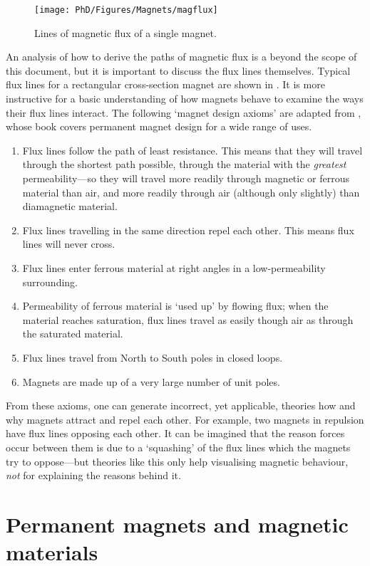 \documentclass[11pt,a4paper]{memoir}
\begin{document}
\begin{figure}
\texttt{[image: PhD/Figures/Magnets/magflux]}
\caption{Lines of magnetic flux of a single magnet.}
\end{figure}

An analysis of how to derive the paths of magnetic flux is a beyond the scope of this document, but it is important to discuss the flux lines themselves.
Typical flux lines for a rectangular cross-section magnet are shown in .
It is more instructive for a basic understanding of how magnets behave to examine the ways their flux lines interact.
The following `magnet
design axioms' are adapted from \textcite{moskowitz1995}, whose book
covers permanent magnet design for a wide range of uses.
\begin{enumerate}
\item Flux lines follow the path of least resistance. This means that they will
travel through the shortest path possible,
through the material with the
\emph{greatest} permeability---so they will travel more readily through
magnetic or ferrous material than air, and more readily through air
(although only slightly) than diamagnetic material.
\item Flux lines travelling in the same direction repel each other. This means
flux lines will never cross.
\item Flux lines enter ferrous material at right angles in a low-permeability surrounding.
\item Permeability of ferrous material is `used up' by flowing flux; when the
material reaches saturation, flux lines travel as easily though air as through
the saturated material.
\item Flux lines travel from North to South poles in closed loops.
\item Magnets are made up of a very large number of unit poles.
\end{enumerate}
From these axioms, one can generate incorrect, yet applicable,
theories how and why magnets attract and repel each other. For
example, two magnets in repulsion have flux lines opposing each
other.
It can be imagined that the reason forces occur between them is
due to a `squashing' of the flux lines which the magnets try to
oppose---but theories like this only help visualising magnetic
behaviour, \emph{not} for explaining the reasons behind it.

\section{Permanent magnets and magnetic materials}
\end{document}
